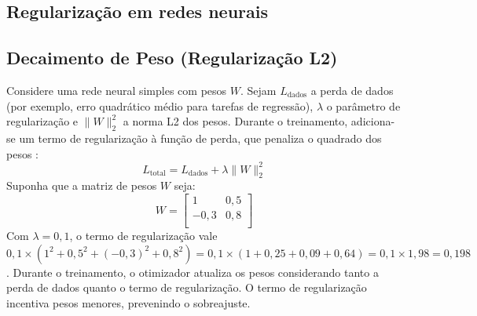 \begin{apendicesenv}
%
%	
%	
%		
%
%
%
	\chapter{Regularização em redes neurais}
	\label{chap:regularizacao}

	\section{Decaimento de Peso (Regularização L2)}
		\label{Apend:regularization}
		\par Considere uma rede neural simples com pesos \( W \). Sejam $L_{\text{dados}}$ a perda de dados (por exemplo, erro quadrático médio para tarefas de regressão), $\lambda$ o parâmetro de regularização e $\|W\|_2^2$ a norma L2 dos pesos. Durante o treinamento, adiciona-se um termo de regularização à função de perda, que penaliza o quadrado dos pesos \cite{krogh1991simple}:
		\begin{equation}
			L_{\text{total}} = L_{\text{dados}} + \lambda \|W\|^2_2
		\end{equation}
		Suponha que a matriz de pesos \( W \) seja:
		\[ W = \begin{bmatrix} 
			1 & 0{,}5 \\
			-0{,}3 & 0{,}8 \\
		\end{bmatrix} \]
		Com \( \lambda = 0{,}1 \), o termo de regularização vale \( 0{,}1 \times (1^2 + 0{,}5^2 + (-0{,}3)^2 + 0{,}8^2) = 0{,}1 \times (1 + 0{,}25 + 0{,}09 + 0{,}64) = 0{,}1 \times 1{,}98 = 0{,}198 \).
		Durante o treinamento, o otimizador atualiza os pesos considerando tanto a perda de dados quanto o termo de regularização. O termo de regularização incentiva pesos menores, prevenindo o sobreajuste.


\end{apendicesenv}
